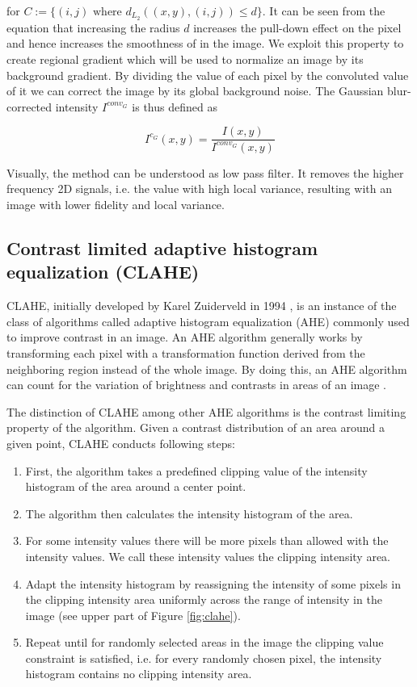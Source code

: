 \documentclass[pdftex,12pt,a4paper]{report}
\begin{document}
for $C := \{(i, j)  \text{  where } d_{L_2}((x, y), (i, j)) \leq d\}$. It can be seen from the equation that increasing the radius $d$ increases the pull-down effect on the pixel and hence increases the smoothness of in the image. We exploit this property to create regional gradient which will be used to normalize an image by its background gradient. By dividing the value of each pixel by the convoluted value of it we can correct the image by its global background noise. The Gaussian blur-corrected intensity $I^{conv_G}$ is thus defined as

\begin{equation}
I^{c_G}(x, y) = \frac{I(x, y)}{I^{conv_G}(x, y)} 
\label{equation:gauss_blur_correction}
\end{equation}

Visually, the method can be understood as low pass filter. It removes the higher frequency 2D signals, i.e. the value with high local variance, resulting with an image with lower fidelity and local variance.

\subsection{Contrast limited adaptive histogram equalization (CLAHE)}
\label{subsection:clahe}

CLAHE, initially developed by Karel Zuiderveld in 1994 \cite{zuiderveld1994contrast}, is an instance of the class of algorithms called adaptive histogram equalization (AHE) commonly used to improve contrast in an image. An AHE algorithm generally works by transforming each pixel with a transformation function derived from the neighboring region instead of the whole image.  By doing this, an AHE algorithm can count for the variation of brightness and contrasts in areas of an image \cite{pizer1987adaptive}.

The distinction of CLAHE among other AHE algorithms is the contrast limiting property of the algorithm. Given a contrast distribution of an area around a given point, CLAHE conducts following steps:

\begin{enumerate}
\item First, the algorithm takes a predefined clipping value of the intensity histogram of the area around a center point.
\item The algorithm then calculates the intensity histogram of the area.
\item For some intensity values there will be more pixels than allowed with the intensity values. We call these intensity values the clipping intensity area.
\item Adapt the intensity histogram by reassigning the intensity of some pixels in the clipping intensity area uniformly across the range of intensity in the image (see upper part of Figure \ref{fig:clahe}).
\item Repeat until for randomly selected areas in the image the clipping value constraint is satisfied, i.e. for every randomly chosen pixel, the intensity histogram contains no clipping intensity area.
\end{enumerate}
\end{document}
